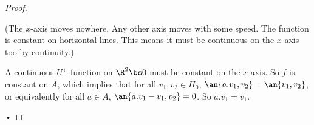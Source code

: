 \begin{proof}
\begin{enumerate}
(The $x$-axis moves nowhere. Any other axis moves with some speed. The function is constant on horizontal lines. This means it must be continuous on the $x$-axis too by continuity.) %

A continuous $U^+$-function on $\R^2\bs 0$ must be constant on the $x$-axis.
So $f$ is constant on $A$, %
which implies that for all $v_1,v_2\in H_0$, $\an{a.v_1,v_2}=\an{v_1,v_2}$, or equivalently for all $a\in A$, $\an{a.v_1-v_1,v_2}=0$. So $a.v_1=v_1$.
\end{enumerate}•
\end{proof}







